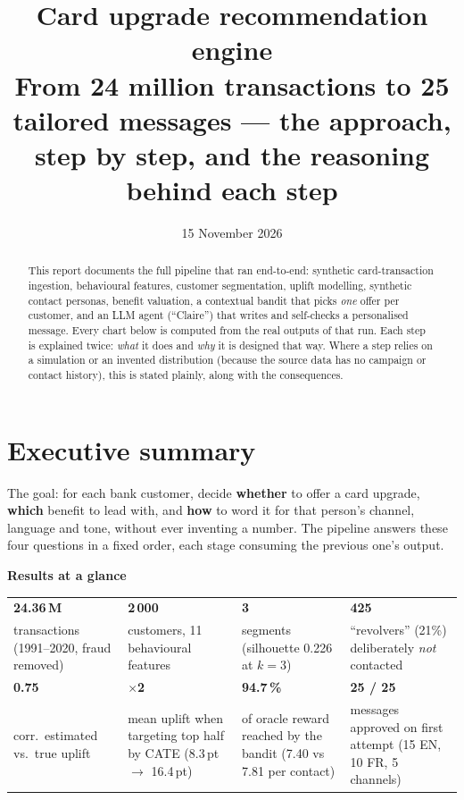 \documentclass[11pt,a4paper]{article}
\title{\textbf{Card upgrade recommendation engine}\\[2pt]
\large From 24 million transactions to 25 tailored messages --- the approach, step by step, and the reasoning behind each step}
\author{}
\date{15 November 2026}
\newcommand{\eur}{\texttt{\texteuro}}
\begin{document}
\maketitle
\thispagestyle{fancy}

\begin{abstract}\noindent
This report documents the full pipeline that ran end-to-end: synthetic card-transaction ingestion, behavioural
features, customer segmentation, uplift modelling, synthetic contact personas, benefit valuation, a contextual
bandit that picks \emph{one} offer per customer, and an LLM agent (``Claire'') that writes and self-checks a
personalised message. Every chart below is computed from the real outputs of that run. Each step is explained
twice: \emph{what} it does and \emph{why} it is designed that way. Where a step relies on a simulation or an
invented distribution (because the source data has no campaign or contact history), this is stated plainly, along
with the consequences.
\end{abstract}

\tableofcontents
\newpage

\section{Executive summary}

The goal: for each bank customer, decide \textbf{whether} to offer a card upgrade, \textbf{which} benefit to
lead with, and \textbf{how} to word it for that person's channel, language and tone, without ever
inventing a number. The pipeline answers these four questions in a fixed order, each stage consuming the previous
one's output.

\begin{keybox}
\textbf{Results at a glance}
\begin{center}
\begin{tabularx}{\linewidth}{@{}XXXX@{}}
\textbf{24.36\,M} & \textbf{2\,000} & \textbf{3} & \textbf{425}\\
\footnotesize transactions (1991--2020, fraud removed) &
\footnotesize customers, 11 behavioural features &
\footnotesize segments (silhouette 0.226 at $k{=}3$) &
\footnotesize ``revolvers'' (21\%) deliberately \emph{not} contacted\\[6pt]
\textbf{0.75} & \textbf{$\times$2} & \textbf{94.7\,\%} & \textbf{25 / 25}\\
\footnotesize corr.\ estimated vs.\ true uplift &
\footnotesize mean uplift when targeting top half by CATE (8.3\,pt $\to$ 16.4\,pt) &
\footnotesize of oracle reward reached by the bandit (\eur 7.40 vs \eur 7.81 per contact) &
\footnotesize messages approved on first attempt (15 EN, 10 FR, 5 channels)
\end{tabularx}
\end{center}
\end{keybox}
\end{document}
